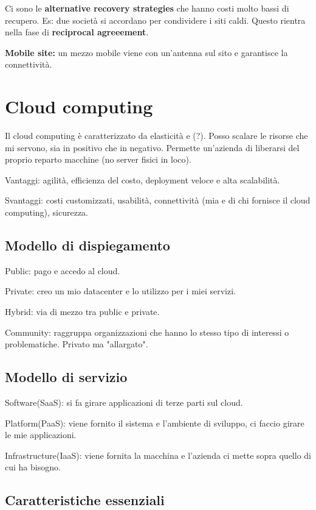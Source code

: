 Ci sono le \textbf{alternative recovery strategies} che hanno costi molto bassi 
di recupero. Es: due società si accordano per condividere i siti caldi. Questo 
rientra nella fase di \textbf{reciprocal agreeement}.

\textbf{Mobile site:} un mezzo mobile viene con un'antenna sul sito e 
garantisce la connettività.

\section{Cloud computing}

Il cloud computing è caratterizzato da elasticità e (?). Posso scalare le 
risorse che mi servono, sia in positivo che in negativo. Permette un'azienda di 
liberarsi del proprio reparto macchine (no server fisici in loco).

Vantaggi: agilità, efficienza del costo, deployment veloce e alta scalabilità.

Svantaggi: costi customizzati, usabilità, connettività (mia e di chi fornisce 
il cloud computing), sicurezza.

\subsection{Modello di dispiegamento}

Public: pago e accedo al cloud.

Private: creo un mio datacenter e lo utilizzo per i miei servizi.

Hybrid: via di mezzo tra public e private.

Community: raggruppa organizzazioni che hanno lo stesso tipo di interessi o 
problematiche. Privato ma "allargato".

\subsection{Modello di servizio}

Software(SaaS): si fa girare applicazioni di terze parti sul cloud.

Platform(PaaS): viene fornito il sistema e l'ambiente di sviluppo, ci faccio 
girare le mie applicazioni. 

Infrastructure(IaaS): viene fornita la macchina e l'azienda ci mette sopra 
quello di cui ha bisogno.

\subsection{Caratteristiche essenziali}

